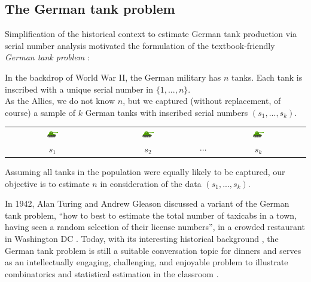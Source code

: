 \documentclass[11pt, oneside]{article}
\newcommand{\data}{$(s_1, ..., s_k)$\xspace}
\begin{document}
\subsection{The German tank problem}
Simplification of the historical context to estimate German tank production via serial number analysis \cite{ruggles1947empirical} motivated the formulation of the textbook-friendly \emph{German tank problem} \cite{goodman1952serial}: 
\begin{tcolorbox}[title=Problem statement, colback=white, colframe=c1]
\noindent 
In the backdrop of World War II, the German military has $n$ tanks. 
Each tank is inscribed with a unique serial number in $\{1, ..., n\}$. \\

As the Allies, we do not know $n$, but we captured (without replacement, of course) a sample of $k$ German tanks with inscribed serial numbers \data. 

\begin{center}
	\begin{tabular}{cccc}
		\includegraphics[width=0.125\textwidth]{tank.png} &  \includegraphics[width=0.125\textwidth]{tank.png}  & & \includegraphics[width=0.125\textwidth]{tank.png} \\
		\large $s_1$ & \large $s_2$ & \large $\cdots$ & \large $s_k$ 
	\end{tabular}
\end{center}

Assuming all tanks in the population were equally likely to be captured, our objective is to estimate $n$ in consideration of the data \data.
\end{tcolorbox}

In 1942, Alan Turing and Andrew Gleason discussed a variant of the German tank problem, ``how to best to estimate the total number of taxicabs in a town, having seen a random selection of their license numbers'', in a crowded restaurant in Washington DC \cite{hodges2014alan,hall2014alan}. 
Today, with its interesting historical background \cite{ruggles1947empirical}, 
the German tank problem is still a suitable conversation topic for dinners and serves as an intellectually engaging, challenging, and enjoyable problem to illustrate combinatorics and statistical estimation in the classroom \cite{johnson1994estimating,berg2021bayesian,mosteller1987fifty,downey2021think}.
\end{document}
